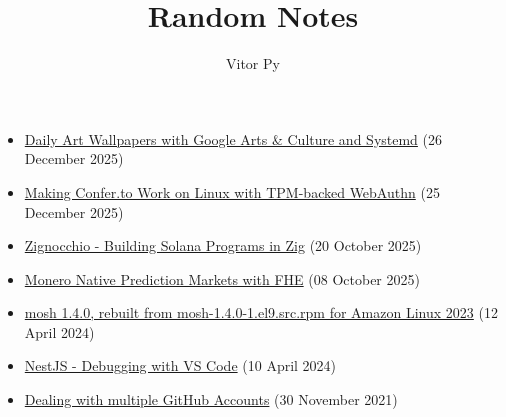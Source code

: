 \documentclass{article}
\title{Random Notes}
\author{Vitor Py}
\date{}
\begin{document}

\maketitle

\begin{itemize}
\item \href{/blog/2025-12-26-google-arts-wallpaper-hyprland/}{Daily Art Wallpapers with Google Arts \& Culture and Systemd} (26 December 2025)

\item \href{/blog/2025-12-25-confer-to-linux-tpm-fido2-prf/}{Making Confer.to Work on Linux with TPM-backed WebAuthn} (25 December 2025)

\item \href{/blog/2025-10-20-zignocchio-solana-zig-sdk/}{Zignocchio - Building Solana Programs in Zig} (20 October 2025)

\item \href{/blog/2025-10-08-monero-native-prediction-markets/}{Monero Native Prediction Markets with FHE} (08 October 2025)

\item \href{/blog/2024-04-12-mosh-amazon-linux-2023/}{mosh 1.4.0, rebuilt from mosh-1.4.0-1.el9.src.rpm for Amazon Linux 2023} (12 April 2024)

\item \href{/blog/2024-04-10-nestjs-hot-reload-debugging/}{NestJS - Debugging with VS Code} (10 April 2024)

\item \href{/blog/2021-11-30-multiple-github-accounts/}{Dealing with multiple GitHub Accounts} (30 November 2021)
\end{itemize}


\end{document}
